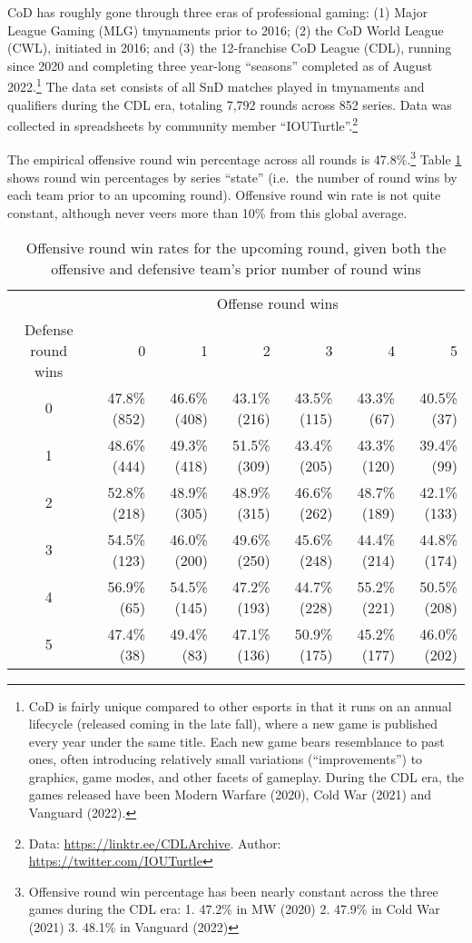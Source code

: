 \documentclass{article}
\begin{document}
CoD has roughly gone through three eras of professional gaming: (1)
Major League Gaming (MLG) tmynaments prior to 2016; (2) the CoD World
League (CWL), initiated in 2016; and (3) the 12-franchise CoD League
(CDL), running since 2020 and completing three year-long ``seasons''
completed as of August 2022.\footnote{CoD is fairly unique compared to
  other esports in that it runs on an annual lifecycle (released coming
  in the late fall), where a new game is published every year under the
  same title. Each new game bears resemblance to past ones, often
  introducing relatively small variations (``improvements'') to
  graphics, game modes, and other facets of gameplay. During the CDL
  era, the games released have been Modern Warfare (2020), Cold War
  (2021) and Vanguard (2022).} The data set consists of all SnD matches
played in tmynaments and qualifiers during the CDL era, totaling 7,792
rounds across 852 series. Data was collected in spreadsheets by
community member ``IOUTurtle''.\footnote{Data:
  \url{https://linktr.ee/CDLArchive}. Author:
  \url{https://twitter.com/IOUTurtle}}

The empirical offensive round win percentage across all rounds is
47.8\%.\footnote{Offensive round win percentage has been nearly constant
  across the three games during the CDL era: 1. 47.2\% in MW (2020) 2.
  47.9\% in Cold War (2021) 3. 48.1\% in Vanguard (2022)} Table
\ref{tbl:cod-o-win-prop-by-series-state} shows round win percentages by
series ``state'' (i.e.~the number of round wins by each team prior to an
upcoming round). Offensive round win rate is not quite constant,
although never veers more than 10\% from this global average.

\begin{longtable}{crrrrrr}
  \caption{Offensive round win rates for the upcoming round, given both the offensive and defensive team's prior number of round wins}\label{tbl:cod-o-win-prop-by-series-state} \\
  \toprule
   & \multicolumn{6}{c}{Offense round wins} \\ 
  \cmidrule(lr){2-7}
  Defense round wins & 0 & 1 & 2 & 3 & 4 & 5 \\ 
    \midrule
    0 & 47.8\%
    (852) & 46.6\%
    (408) & 43.1\%
    (216) & 43.5\%
    (115) & 43.3\%
    (67) & 40.5\%
    (37) \\ 
    1 & 48.6\%
    (444) & 49.3\%
    (418) & 51.5\%
    (309) & 43.4\%
    (205) & 43.3\%
    (120) & 39.4\%
    (99) \\ 
    2 & 52.8\%
    (218) & 48.9\%
    (305) & 48.9\%
    (315) & 46.6\%
    (262) & 48.7\%
    (189) & 42.1\%
    (133) \\ 
    3 & 54.5\%
    (123) & 46.0\%
    (200) & 49.6\%
    (250) & 45.6\%
    (248) & 44.4\%
    (214) & 44.8\%
    (174) \\ 
    4 & 56.9\%
    (65) & 54.5\%
    (145) & 47.2\%
    (193) & 44.7\%
    (228) & 55.2\%
    (221) & 50.5\%
    (208) \\ 
    5 & 47.4\%
    (38) & 49.4\%
    (83) & 47.1\%
    (136) & 50.9\%
    (175) & 45.2\%
    (177) & 46.0\%
    (202) \\ 
  \bottomrule
\end{longtable}
\end{document}

